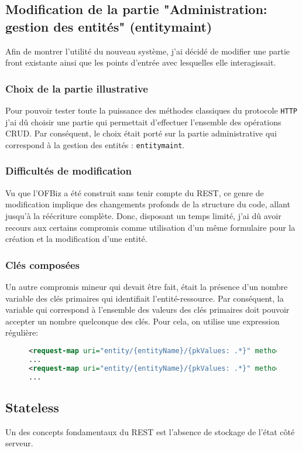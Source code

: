 \subsection{Modification de la partie "Administration: gestion des entités"  (entitymaint)  }
Afin de montrer l'utilité du nouveau système, j'ai décidé de modifier une partie front existante ainsi que les points d'entrée avec lesquelles elle interagissait.
\subsubsection{Choix de la partie illustrative}
Pour pouvoir tester toute la puissance des méthodes classiques du protocole \verb|HTTP| j'ai dû choisir une partie qui permettait d'effectuer l'ensemble des opérations CRUD. Par conséquent, le choix était porté sur la partie administrative qui correspond à la gestion des entités : \verb|entitymaint|.
\subsubsection{Difficultés de modification} 
Vu que l'OFBiz a été construit sans tenir compte du REST, ce genre de modification implique des changements profonds de la structure du code, allant jusqu'à la réécriture complète. Donc, disposant un temps limité, j'ai dû avoir recours aux certains compromis comme utilisation d'un même formulaire pour la création et la modification d'une entité.
\subsubsection{Clés composées}
Un autre compromis mineur qui devait être fait, était la présence d'un nombre variable des clés primaires qui identifiait l'entité-ressource. Par conséquent, la variable qui correspond à l'ensemble des valeurs des clés primaires doit pouvoir accepter un nombre quelconque des clés. Pour cela, on utilise une expression régulière: 

\begin{figure}[h!]
	\begin{lstlisting}[frame=leftline,language=xml,frameround=tttt]
<request-map uri="entity/{entityName}/{pkValues: .*}" method="get">
...
<request-map uri="entity/{entityName}/{pkValues: .*}" method="delete">
...

	\end{lstlisting}
\end{figure}  
\subsection{Stateless}
Un des concepts fondamentaux du REST est l'absence de stockage de l'état côté serveur. 
